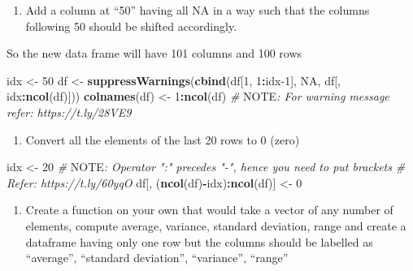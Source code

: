\documentclass[]{article}
\newenvironment{Shaded}{\begin{snugshade}}{\end{snugshade}}
\newcommand{\AlertTok}[1]{\textcolor[rgb]{0.94,0.16,0.16}{#1}}
\newcommand{\CommentTok}[1]{\textcolor[rgb]{0.56,0.35,0.01}{\textit{#1}}}
\newcommand{\DecValTok}[1]{\textcolor[rgb]{0.00,0.00,0.81}{#1}}
\newcommand{\KeywordTok}[1]{\textcolor[rgb]{0.13,0.29,0.53}{\textbf{#1}}}
\newcommand{\NormalTok}[1]{#1}
\newcommand{\OperatorTok}[1]{\textcolor[rgb]{0.81,0.36,0.00}{\textbf{#1}}}
\newcommand{\OtherTok}[1]{\textcolor[rgb]{0.56,0.35,0.01}{#1}}
\newcommand{\StringTok}[1]{\textcolor[rgb]{0.31,0.60,0.02}{#1}}
\providecommand{\tightlist}{%
  \setlength{\itemsep}{0pt}\setlength{\parskip}{0pt}}
\begin{document}
\begin{enumerate}
\def\labelenumi{\arabic{enumi}.}
\setcounter{enumi}{2}
\tightlist
\item
  Add a column at ``50'' having all NA in a way such that the columns
  following 50 should be shifted accordingly.
\end{enumerate}

So the new data frame will have 101 columns and 100 rows

\begin{Shaded}
\begin{Highlighting}[]
\NormalTok{idx <-}\StringTok{ }\DecValTok{50}
\NormalTok{df <-}\StringTok{ }\KeywordTok{suppressWarnings}\NormalTok{(}\KeywordTok{cbind}\NormalTok{(df[}\DecValTok{1}\NormalTok{, }\DecValTok{1}\OperatorTok{:}\NormalTok{idx}\DecValTok{-1}\NormalTok{], }\OtherTok{NA}\NormalTok{, df[, idx}\OperatorTok{:}\KeywordTok{ncol}\NormalTok{(df)]))}
\KeywordTok{colnames}\NormalTok{(df) <-}\StringTok{ }\DecValTok{1}\OperatorTok{:}\KeywordTok{ncol}\NormalTok{(df)}
\CommentTok{# }\AlertTok{NOTE}\CommentTok{: For warning message refer: https://t.ly/28VE9}
\end{Highlighting}
\end{Shaded}

\begin{enumerate}
\def\labelenumi{\arabic{enumi}.}
\setcounter{enumi}{3}
\tightlist
\item
  Convert all the elements of the last 20 rows to 0 (zero)
\end{enumerate}

\begin{Shaded}
\begin{Highlighting}[]
\NormalTok{idx <-}\StringTok{ }\DecValTok{20}
\CommentTok{# }\AlertTok{NOTE}\CommentTok{: Operator ":" precedes "-", hence you need to put brackets}
\CommentTok{#       Refer: https://t.ly/60yqO}
\NormalTok{df[, (}\KeywordTok{ncol}\NormalTok{(df)}\OperatorTok{-}\NormalTok{idx)}\OperatorTok{:}\KeywordTok{ncol}\NormalTok{(df)] <-}\StringTok{ }\DecValTok{0} 
\end{Highlighting}
\end{Shaded}

\begin{enumerate}
\def\labelenumi{\arabic{enumi}.}
\setcounter{enumi}{4}
\tightlist
\item
  Create a function on your own that would take a vector of any number
  of elements, compute average, variance, standard deviation, range and
  create a dataframe having only one row but the columns should be
  labelled as ``average'', ``standard deviation'', ``variance'',
  ``range''
\end{enumerate}
\end{document}
